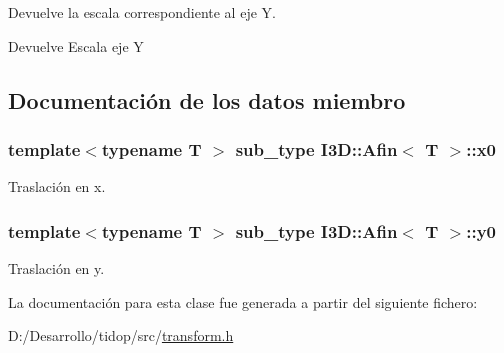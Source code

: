 Devuelve la escala correspondiente al eje Y. 

\begin{DoxyReturn}{Devuelve}
Escala eje Y 
\end{DoxyReturn}


\subsection{Documentación de los datos miembro}
\subsubsection[{\texorpdfstring{x0}{x0}}]{\setlength{\rightskip}{0pt plus 5cm}template$<$typename T $>$ {\bf sub\+\_\+type} {\bf I3\+D\+::\+Afin}$<$ T $>$\+::x0}\hypertarget{class_i3_d_1_1_afin_aff62b2c4443c19c78940f4113e67183b}{}\label{class_i3_d_1_1_afin_aff62b2c4443c19c78940f4113e67183b}


Traslación en x. 

\subsubsection[{\texorpdfstring{y0}{y0}}]{\setlength{\rightskip}{0pt plus 5cm}template$<$typename T $>$ {\bf sub\+\_\+type} {\bf I3\+D\+::\+Afin}$<$ T $>$\+::y0}\hypertarget{class_i3_d_1_1_afin_ac687b5efb2b75262c7aeeb31a2792c34}{}\label{class_i3_d_1_1_afin_ac687b5efb2b75262c7aeeb31a2792c34}


Traslación en y. 



La documentación para esta clase fue generada a partir del siguiente fichero\+:\begin{DoxyCompactItemize}
\item 
D\+:/\+Desarrollo/tidop/src/\hyperlink{transform_8h}{transform.\+h}\end{DoxyCompactItemize}
